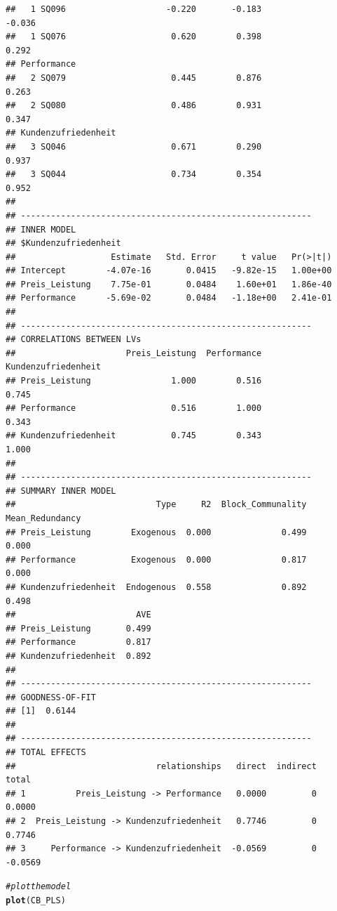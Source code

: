 \documentclass{article}\usepackage[]{graphicx}\usepackage[]{color}
\makeatletter
\newcommand{\hlcom}[1]{\textcolor[rgb]{0.678,0.584,0.686}{\textit{#1}}}%
\newcommand{\hlstd}[1]{\textcolor[rgb]{0.345,0.345,0.345}{#1}}%
\newcommand{\hlkwd}[1]{\textcolor[rgb]{0.737,0.353,0.396}{\textbf{#1}}}%
\newenvironment{kframe}{%
 \def\at@end@of@kframe{}%
 \ifinner\ifhmode%
  \def\at@end@of@kframe{\end{minipage}}%
  \begin{minipage}{\columnwidth}%
 \fi\fi%
 \def\FrameCommand##1{\hskip\@totalleftmargin \hskip-\fboxsep
 \colorbox{shadecolor}{##1}\hskip-\fboxsep
     \hskip-\linewidth \hskip-\@totalleftmargin \hskip\columnwidth}%
 \MakeFramed {\advance\hsize-\width
   \@totalleftmargin\z@ \linewidth\hsize
   \@setminipage}}%
 {\par\unskip\endMakeFramed%
 \at@end@of@kframe}
\newenvironment{knitrout}{}{} %
\makeatother
\begin{document}
\begin{knitrout}
\begin{kframe}
\begin{verbatim}
##   1 SQ096                    -0.220       -0.183               -0.036
##   1 SQ076                     0.620        0.398                0.292
## Performance                                                          
##   2 SQ079                     0.445        0.876                0.263
##   2 SQ080                     0.486        0.931                0.347
## Kundenzufriedenheit                                                  
##   3 SQ046                     0.671        0.290                0.937
##   3 SQ044                     0.734        0.354                0.952
## 
## ---------------------------------------------------------- 
## INNER MODEL 
## $Kundenzufriedenheit
##                   Estimate   Std. Error     t value   Pr(>|t|)
## Intercept        -4.07e-16       0.0415   -9.82e-15   1.00e+00
## Preis_Leistung    7.75e-01       0.0484    1.60e+01   1.86e-40
## Performance      -5.69e-02       0.0484   -1.18e+00   2.41e-01
## 
## ---------------------------------------------------------- 
## CORRELATIONS BETWEEN LVs 
##                      Preis_Leistung  Performance  Kundenzufriedenheit
## Preis_Leistung                1.000        0.516                0.745
## Performance                   0.516        1.000                0.343
## Kundenzufriedenheit           0.745        0.343                1.000
## 
## ---------------------------------------------------------- 
## SUMMARY INNER MODEL 
##                            Type     R2  Block_Communality  Mean_Redundancy
## Preis_Leistung        Exogenous  0.000              0.499            0.000
## Performance           Exogenous  0.000              0.817            0.000
## Kundenzufriedenheit  Endogenous  0.558              0.892            0.498
##                        AVE
## Preis_Leistung       0.499
## Performance          0.817
## Kundenzufriedenheit  0.892
## 
## ---------------------------------------------------------- 
## GOODNESS-OF-FIT 
## [1]  0.6144
## 
## ---------------------------------------------------------- 
## TOTAL EFFECTS 
##                            relationships   direct  indirect    total
## 1          Preis_Leistung -> Performance   0.0000         0   0.0000
## 2  Preis_Leistung -> Kundenzufriedenheit   0.7746         0   0.7746
## 3     Performance -> Kundenzufriedenheit  -0.0569         0  -0.0569
\end{verbatim}
\begin{alltt}
\hlcom{#plot the model}
\hlkwd{plot}\hlstd{(CB_PLS)}
\end{alltt}
\end{kframe}

\end{knitrout}
\end{document}
